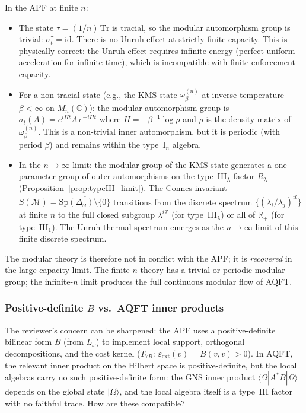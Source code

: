 \documentclass[11pt,a4paper]{article}
\theoremstyle{definition}
\begin{document}
In the APF at finite $n$:
\begin{itemize}[nosep]
  \item The state $\tau = (1/n)\,\mathrm{Tr}$ is tracial, so the
  modular automorphism group is trivial: $\sigma_t^\tau = \mathrm{id}$.
  There is no Unruh effect at strictly finite capacity.  This is
  physically correct: the Unruh effect requires infinite energy
  (perfect uniform acceleration for infinite time), which is
  incompatible with finite enforcement capacity.
  \item For a non-tracial state (e.g., the KMS state
  $\omega_\beta^{(n)}$ at inverse temperature $\beta < \infty$ on
  $M_n(\mathbb{C})$): the modular automorphism group is
  $\sigma_t(A) = e^{iHt} A\, e^{-iHt}$ where
  $H = -\beta^{-1} \log \rho$ and $\rho$ is the density matrix of
  $\omega_\beta^{(n)}$.  This is a non-trivial inner automorphism, but
  it is periodic (with period $\beta$) and remains within the
  type~I$_n$ algebra.
  \item In the $n \to \infty$ limit: the modular group of the
  KMS state generates a one-parameter group of outer automorphisms
  on the type~III$_\lambda$ factor $R_\lambda$
  (Proposition~\ref{prop:typeIII_limit}).  The Connes invariant
  $S(\mathcal{M}) = \overline{\mathrm{Sp}(\Delta_\omega) \setminus
  \{0\}}$ transitions from the discrete spectrum
  $\{(\lambda_i / \lambda_j)^{it}\}$ at finite $n$ to the full closed
  subgroup $\lambda^{i\mathbb{Z}}$ (for type~III$_\lambda$) or all of
  $\mathbb{R}_+$ (for type~III$_1$).  The Unruh thermal spectrum
  emerges as the $n \to \infty$ limit of this finite discrete spectrum.
\end{itemize}
The modular theory is therefore not in conflict with the APF; it is
\emph{recovered} in the large-capacity limit.  The finite-$n$ theory
has a trivial or periodic modular group; the infinite-$n$ limit
produces the full continuous modular flow of AQFT.


\subsubsection{Positive-definite $B$ vs.\ AQFT inner products}
\label{sec:B_vs_AQFT}

The reviewer's concern can be sharpened: the APF uses a
positive-definite bilinear form $B$ (from $L_\omega$) to implement
local support, orthogonal decompositions, and the cost kernel
($T_{7B}$: $\varepsilon_{\mathrm{ext}}(v) = B(v,v) > 0$).  In AQFT,
the relevant inner product on the Hilbert space is positive-definite,
but the local algebras carry no such positive-definite form: the GNS
inner product $\langle\Omega|A^*B|\Omega\rangle$ depends on the
global state $|\Omega\rangle$, and the local algebra itself is a
type~III factor with no faithful trace.  How are these compatible?
\end{document}
